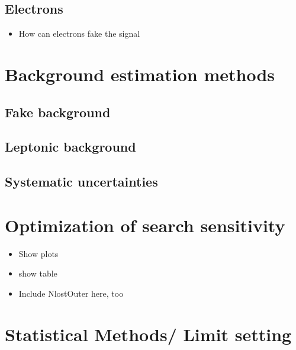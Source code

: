\subsection{Electrons}
\begin{itemize}
\item How can electrons fake the signal
\end{itemize}
\section{Background estimation methods}
\label{sec:BackgroundEstimation}
\subsection{Fake background}
\subsection{Leptonic background}
\subsection{Systematic uncertainties}

\section{Optimization of search sensitivity}
\label{sec:Optimization}
\begin{itemize}
\item Show plots
\item show table
\item Include NlostOuter here, too
\end{itemize}

\section{Statistical Methods/ Limit setting}
\label{sec:LimitSetting}

